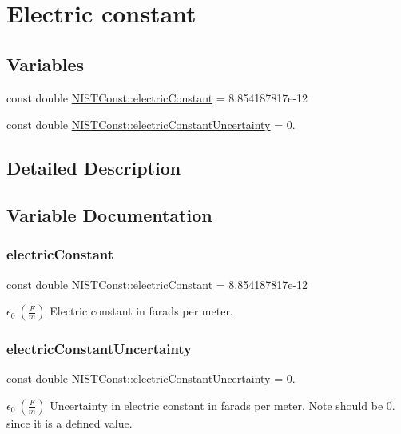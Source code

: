 \hypertarget{group___electric_constant}{}\section{Electric constant}
\label{group___electric_constant}
\subsection*{Variables}
\begin{DoxyCompactItemize}
\item 
const double \hyperlink{group___electric_constant_gae5a425228125285727dd53333725ef76}{N\+I\+S\+T\+Const\+::electric\+Constant} = 8.\+854187817e-\/12
\item 
const double \hyperlink{group___electric_constant_gaf65e89a9fe674a6f80f5a66bbe101aab}{N\+I\+S\+T\+Const\+::electric\+Constant\+Uncertainty} = 0.
\end{DoxyCompactItemize}


\subsection{Detailed Description}


\subsection{Variable Documentation}
\mbox{\label{group___electric_constant_gae5a425228125285727dd53333725ef76}} 
\subsubsection{\texorpdfstring{electric\+Constant}{electricConstant}}
{\footnotesize\ttfamily const double N\+I\+S\+T\+Const\+::electric\+Constant = 8.\+854187817e-\/12}

$\epsilon_0 \ (\frac{F}{m})$ Electric constant in farads per meter. \mbox{\label{group___electric_constant_gaf65e89a9fe674a6f80f5a66bbe101aab}} 
\subsubsection{\texorpdfstring{electric\+Constant\+Uncertainty}{electricConstantUncertainty}}
{\footnotesize\ttfamily const double N\+I\+S\+T\+Const\+::electric\+Constant\+Uncertainty = 0.}

$\epsilon_0 \ (\frac{F}{m})$ Uncertainty in electric constant in farads per meter. Note should be 0. since it is a defined value. 